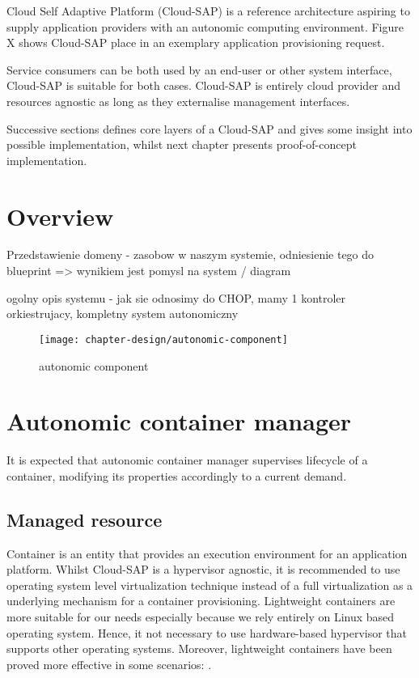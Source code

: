 Cloud Self Adaptive Platform (Cloud-SAP) is a reference architecture aspiring to supply application providers with an autonomic computing environment. Figure X shows Cloud-SAP place in an exemplary application provisioning request. 

Service consumers can be both used by an end-user or other system interface, Cloud-SAP is suitable for both cases. Cloud-SAP is entirely cloud provider and resources agnostic as long as they externalise management interfaces.

Successive sections defines core layers of a Cloud-SAP and gives some insight into possible implementation, whilst next chapter presents proof-of-concept implementation.

\section{Overview}
Przedstawienie domeny - zasobow w naszym systemie, odniesienie tego do blueprint => wynikiem jest pomysl na system / diagram

ogolny opis systemu - jak sie odnosimy do CHOP, mamy 1 kontroler orkiestrujacy, kompletny system autonomiczny

\begin{figure}[!ht]
  \begin{center}
    \texttt{[image: chapter-design/autonomic-component]}
  \end{center}
  \caption{autonomic component}
  \label{img:autonomic-component}
\end{figure}


\section{Autonomic container manager}
It is expected that autonomic container manager supervises lifecycle of a container, modifying its properties accordingly to a current demand.

\subsection{Managed resource}
Container is an entity that provides an execution environment for an application platform. Whilst Cloud-SAP is a hypervisor agnostic, it is recommended to use operating system level virtualization technique instead of a full virtualization as a underlying mechanism for a container provisioning. Lightweight containers are more suitable for our needs especially because we rely entirely on Linux based operating system. Hence, it not necessary to use hardware-based hypervisor that supports other operating systems. Moreover, lightweight containers have been proved more effective in some scenarios: \cite{RaHiSj13}.

